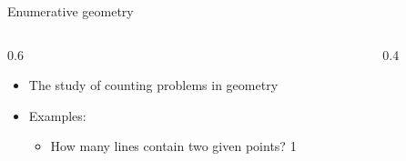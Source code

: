 \documentclass{beamer}
\theoremstyle{definition}
\begin{document}
    \begin{frame}{Enumerative geometry}

      \begin{columns}[c]
        \begin{column}{0.6\hsize}
      
          \begin{itemize}
          \item The study of counting problems in geometry
          \item Examples: \begin{itemize}
          \item How many lines contain two given points? {\color{red} 1}
          \end{itemize}
          \end{itemize}
        \end{column}
        \begin{column}{0.4\hsize}

          \centering
          \vspace*{1.2in}
          
        \end{column}
      \end{columns}
    \end{frame}
\end{document}
